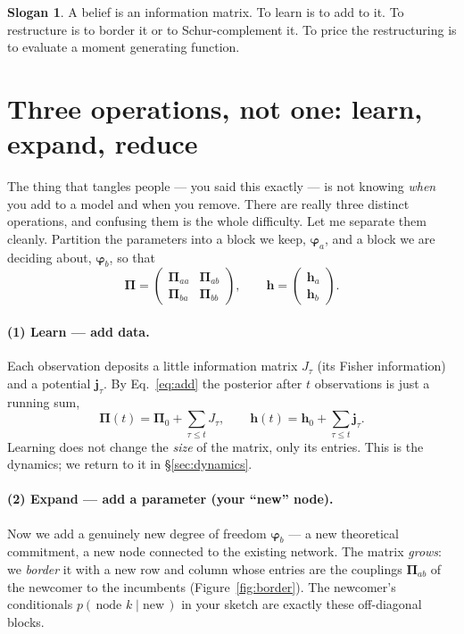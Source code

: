 \documentclass[11pt]{article}
\newcommand{\Prec}{\bm{\Pi}}        %
\newcommand{\hvec}{\bm{h}}          %
\newcommand{\fvec}{\bm{\varphi}}    %
\theoremstyle{definition}
\newtheorem*{slogan}{Slogan}
\begin{document}
\begin{slogan}
A belief is an information matrix. To learn is to add to it. To
restructure is to border it or to Schur-complement it. To price the
restructuring is to evaluate a moment generating function.
\end{slogan}

\section{Three operations, not one: learn, expand, reduce}

The thing that tangles people --- you said this exactly --- is not knowing
\emph{when} you add to a model and when you remove. There are really three
distinct operations, and confusing them is the whole difficulty. Let me
separate them cleanly. Partition the parameters into a block we keep,
$\fvec_a$, and a block we are deciding about, $\fvec_b$, so that
\begin{equation}
\Prec=\begin{pmatrix}\Prec_{aa}&\Prec_{ab}\\[2pt]\Prec_{ba}&\Prec_{bb}\end{pmatrix},
\qquad
\hvec=\begin{pmatrix}\hvec_a\\ \hvec_b\end{pmatrix}.
\label{eq:block}
\end{equation}

\paragraph{(1) Learn --- add data.} Each observation deposits a little
information matrix $J_\tau$ (its Fisher information) and a potential
$\bm j_\tau$. By Eq.~\eqref{eq:add} the posterior after $t$ observations
is just a running sum,
\begin{equation}
\Prec(t)=\Prec_0+\sum_{\tau\le t}J_\tau,\qquad
\hvec(t)=\hvec_0+\sum_{\tau\le t}\bm j_\tau.
\label{eq:accum}
\end{equation}
Learning does not change the \emph{size} of the matrix, only its entries.
This is the dynamics; we return to it in \S\ref{sec:dynamics}.

\paragraph{(2) Expand --- add a parameter (your ``new'' node).} Now we add
a genuinely new degree of freedom $\fvec_b$ --- a new theoretical
commitment, a new node connected to the existing network. The matrix
\emph{grows}: we \emph{border} it with a new row and column whose entries
are the couplings $\Prec_{ab}$ of the newcomer to the incumbents
(Figure~\ref{fig:border}). The newcomer's conditionals $p(\,\text{node }k
\mid \text{new}\,)$ in your sketch are exactly these off-diagonal blocks.
\end{document}

